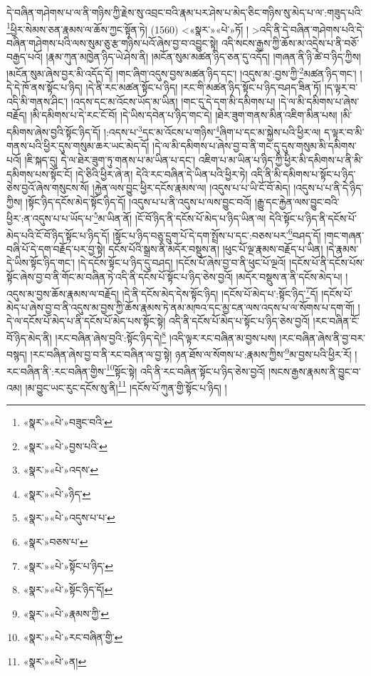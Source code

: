དེ་བཞིན་གཤེགས་པ་ལ་ནི་གཉིས་ཀྱི་རྗེས་སུ་འབྲང་བའི་རྣམ་པར་ཤེས་པ་མེད་ཅིང་གཉིས་སུ་མེད་པ་ལ་:གཟུད་པའི་\footnote{«སྣར་»«པེ་»བཟུང་བའི་}ཕྱིར་སེམས་ཅན་རྣམས་ལ་ཆོས་ཀྱང་སྟོན་ཏེ། (1560) <«སྣར་»«པེ་»ཏོ། །
 >འདི་ནི་དེ་བཞིན་གཤེགས་པའི་དེ་བཞིན་གཤེགས་པའི་ལས་སུམ་ཅུ་རྩ་གཉིས་པའོ་ཞེས་བྱ་བ་འབྱུང་སྟེ། འདི་སངས་རྒྱས་ཀྱི་ཆོས་མ་འདྲེས་པ་ནི་བཅོ་བརྒྱད་པའོ། །རྣམ་ཀུན་མཁྱེན་ཉིད་ཡེ་ཤེས་ནི། །མངོན་སུམ་མཚན་ཉིད་ཅན་དུ་འདོད། །གཞན་ནི་ཉི་ཚེ་བ་ཉིད་ཀྱིས། །མངོན་སུམ་ཞེས་བྱར་མི་འདོད་དོ། །གང་ཞིག་འདུས་བྱས་མཚན་ཉིད་དང་། །འདུས་མ་:བྱས་ཀྱི་\footnote{«སྣར་»«པེ་»བྱས་པའི་}མཚན་ཉིད་གང་། །དེ་དེ་ཁོ་ནས་སྟོང་པ་ཉིད། །དེ་ནི་རང་མཚན་སྟོང་པ་ཉིད། །རང་གི་མཚན་ཉིད་སྟོང་པ་ཉིད་བཤད་ཟིན་ཏོ། །ད་ལྟར་བ་འདི་མི་གནས་ཤིང་། །འདས་དང་མ་འོངས་ཡོད་མ་ཡིན། །གང་དུ་དེ་དག་མི་དམིགས་པ། །དེ་ལ་མི་དམིགས་པ་ཞེས་བརྗོད། །མི་དམིགས་པ་དེ་རང་ངོ་བོ། །དེ་ཡིས་དབེན་པ་ཉིད་གང་དེ། །ཐེར་ཟུག་གནས་མིན་འཇིག་མིན་པས། །མི་དམིགས་ཞེས་བྱའི་སྟོང་ཉིད་དོ། །:འདས་པ་\footnote{«སྣར་»«པེ་»འདས་}དང་མ་འོངས་པ་གཉིས་\footnote{«སྣར་»«པེ་»ཉིད་}ཞིག་པ་དང་མ་སྐྱེས་པའི་ཕྱིར་ལ། ད་ལྟར་བ་མི་གནས་པའི་ཕྱིར་དུས་གསུམ་ཆར་ཡང་མེད་དོ། །དེ་ལ་མི་དམིགས་པ་ཞེས་བྱ་བ་ནི་གང་དུ་དུས་གསུམ་མི་དམིགས་པའོ། །ཇི་སྐད་དུ། དེ་ལ་ཐེར་ཟུག་ཏུ་གནས་པ་མ་ཡིན་པ་དང་། འཇིག་པ་མ་ཡིན་པ་ཉིད་ཀྱི་ཕྱིར་མི་དམིགས་པ་ནི་མི་དམིགས་པས་སྟོང་ངོ། །དེ་ཅིའི་ཕྱིར་ཞེ་ན། དེའི་རང་བཞིན་དེ་ཡིན་པའི་ཕྱིར་ཏེ། འདི་ནི་མི་དམིགས་པ་སྟོང་པ་ཉིད་ཅེས་བྱའོ་ཞེས་གསུངས་སོ། །རྐྱེན་ལས་བྱུང་ཕྱིར་དངོས་རྣམས་ལ། །འདུས་པ་པ་ཡི་ངོ་བོ་མེད། །འདུས་པ་པ་ནི་དེ་ཉིད་ཀྱིས། །སྟོང་ཉིད་དངོས་མེད་སྟོང་ཉིད་དོ། །འདུས་པ་པ་ནི་འདུས་པ་ལས་བྱུང་བའོ། །རྒྱུ་དང་རྐྱེན་ལས་བྱུང་བའི་ཕྱིར་:ན་འདུས་པ་པ་ཡོད་པ་\footnote{«སྣར་»«པེ་»འདུས་པ་པ་}མ་ཡིན་ནོ། །ངོ་བོ་ཉིད་ནི་དངོས་པོ་མེད་པ་ཉིད་ཡིན་ལ། དེའི་སྟོང་པ་ཉིད་ནི་དངོས་པོ་མེད་པའི་ངོ་བོ་ཉིད་སྟོང་པ་ཉིད་དོ། །སྟོང་པ་ཉིད་བཅུ་དྲུག་པོ་དེ་དག་སྤྲོས་པ་དང་:བཅས་པར་\footnote{«སྣར་»བཅས་པ་}བཤད་དོ། །གང་གཞན་བཞི་པོ་དེ་དག་བརྗོད་པར་བྱ་སྟེ། དངོས་པོའི་སྒྲས་ནི་མདོར་བསྡུས་ན། །ཕུང་པོ་ལྔ་རྣམས་བརྗོད་པ་ཡིན། །དེ་རྣམས་དེ་ཡིས་སྟོང་ཉིད་གང་། །དེ་དངོས་སྟོང་པ་ཉིད་དུ་བཤད། །དངོས་པོ་ཞེས་བྱ་བ་ནི་ཕུང་པོ་ལྔའོ། །དངོས་པོ་ནི་དངོས་པོས་སྟོང་ཞེས་བྱ་བ་ནི་གོང་མ་བཞིན་ཏེ་འདི་ནི་དངོས་པོ་སྟོང་པ་ཉིད་ཅེས་བྱའོ། །མདོར་བསྡུས་ན་ནི་དངོས་མེད་པ། །འདུས་མ་བྱས་ཆོས་རྣམས་ལ་བརྗོད། །དེ་ནི་དངོས་མེད་དེས་སྟོང་ཉིད། །དངོས་པོ་མེད་པ་:སྟོང་ཉིད་\footnote{«སྣར་»«པེ་»སྟོང་པ་ཉིད་}དོ། །དངོས་པོ་མེད་པ་ཞེས་བྱ་བ་ནི་འདུས་མ་བྱས་ཀྱི་ཆོས་རྣམས་ཏེ་ནམ་མཁའ་དང་མྱ་ངན་ལས་འདས་པ་ལ་སོགས་པ་དག་གོ། །དེ་ལ་དངོས་པོ་མེད་པ་ནི་དངོས་པོ་མེད་པས་སྟོང་སྟེ། འདི་ནི་དངོས་པོ་མེད་པ་སྟོང་པ་ཉིད་ཅེས་བྱའོ། །རང་བཞིན་ངོ་བོ་ཉིད་མེད་ནི། །རང་བཞིན་ཞེས་བྱའི་:སྟོང་ཉིད་དེ།\footnote{«སྣར་»«པེ་»སྟོང་ཉིད་དོ།} །འདི་ལྟར་རང་བཞིན་མ་བྱས་པས། །རང་བཞིན་ཞེས་ནི་བྱ་བར་བསྙད། །རང་བཞིན་ཞེས་བྱ་བ་ནི་རང་བཞིན་ལ་བྱ་སྟེ། ཉན་ཐོས་ལ་སོགས་པ་:རྣམས་ཀྱིས་\footnote{«སྣར་»«པེ་»རྣམས་ཀྱི་}མ་བྱས་པའི་ཕྱིར་རོ། །རང་བཞིན་ནི་:རང་བཞིན་གྱིས་\footnote{«སྣར་»«པེ་»རང་བཞིན་གྱི་}སྟོང་སྟེ། འདི་ནི་རང་བཞིན་སྟོང་པ་ཉིད་ཅེས་བྱའོ། །སངས་རྒྱས་རྣམས་ནི་བྱུང་བ་འམ། །མ་བྱུང་ཡང་རུང་དངོས་སུ་ནི།\footnote{«སྣར་»«པེ་»ན།} །དངོས་པོ་ཀུན་གྱི་སྟོང་པ་ཉིད། །
